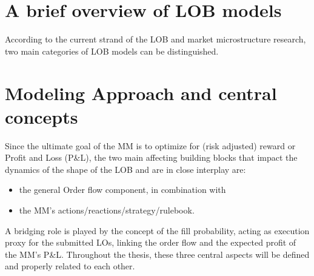 \documentclass[11pt,a4paper]{cau_exec_summary}
\begin{document}
\section{A brief overview of LOB models}
According to the current strand of the LOB and market microstructure research, two main categories of LOB models can be distinguished. 


\section{Modeling Approach and central concepts}
Since the ultimate goal of the MM is to optimize for (risk adjusted) reward or Profit and Loss (P\&L), the two main affecting building blocks that impact the dynamics of the shape of the LOB and are in close interplay are:
\begin{itemize}
    \item the general Order flow component, in combination with
    \item the MM's actions/reactions/strategy/rulebook.
\end{itemize}
A bridging role is played by the concept of the fill probability, acting as execution proxy for the submitted LOs, linking the order flow and the expected profit of the MM's P\&L.
Throughout the thesis, these three central aspects will be defined and properly related to each other.
\end{document}
